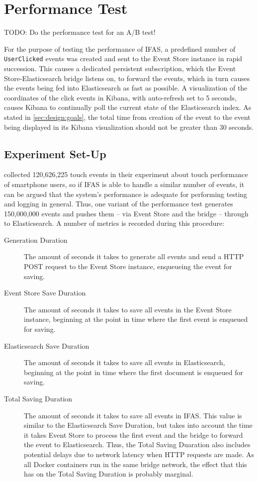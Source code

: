 \section{Performance Test}
\label{sec:evaluation:performance}

TODO: Do the performance test for an A/B test!

For the purpose of testing the performance of \ac{IFAS}, a predefined number of \texttt{UserClicked} events was created and sent to the Event Store instance in rapid succession.
This causes a dedicated persistent subscription, which the Event Store-Elasticsearch bridge listens on, to forward the events, which in turn causes the events being fed into Elasticsearch as fast as possible.
A visualization of the coordinates of the click events in Kibana, with auto-refresh set to 5 seconds, causes Kibana to continually poll the current state of the Elasticsearch index.
As stated in \cref{sec:design:goals}, the total time from creation of the event to the event being displayed in its Kibana visualization should not be greater than 30 seconds.

\subsection{Experiment Set-Up}

\citet{Henze2011} collected 120,626,225 touch events in their experiment about touch performance of smartphone users, so if \ac{IFAS} is able to handle a similar number of events, it can be argued that the system's performance is adequate for performing testing and logging in general.
Thus, one variant of the performance test generates 150,000,000 events and pushes them -- via Event Store and the bridge -- through to Elasticsearch.
A number of metrics is recorded during this procedure:

\begin{description}
\item[Generation Duration] The amount of seconds it takes to generate all events and send a \ac{HTTP} POST request to the Event Store instance, enqueueing the event for saving.
\item[Event Store Save Duration] The amount of seconds it takes to save all events in the Event Store instance, beginning at the point in time where the first event is enqueued for saving.
\item[Elasticsearch Save Duration] The amount of seconds it takes to save all events in Elasticsearch, beginning at the point in time where the first document is enqueued for saving.
\item[Total Saving Duration] The amount of seconds it takes to save all events in \ac{IFAS}.
This value is similar to the Elasticsearch Save Duration, but takes into account the time it takes Event Store to process the first event and the bridge to forward the event to Elasticsearch.
Thus, the Total Saving Duaration also includes potential delays due to network latency when \ac{HTTP} requests are made.
As all Docker containers run in the same bridge network, the effect that this has on the Total Saving Duration is probably marginal.
\end{description}

